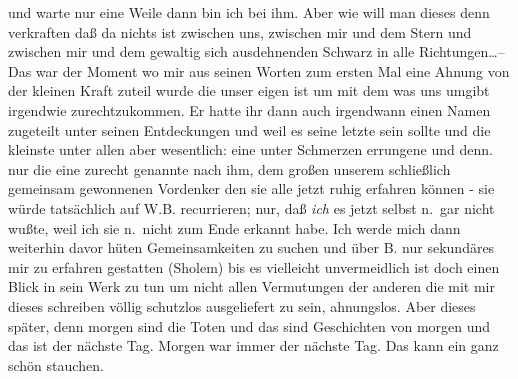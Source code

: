 \documentclass[
]{article}
\begin{document}
\begin{itemize}
  und warte nur eine Weile dann bin ich bei ihm. Aber wie will man
  dieses denn verkraften daß da nichts ist zwischen uns, zwischen mir
  und dem Stern und zwischen mir und dem gewaltig sich ausdehnenden
  Schwarz in alle Richtungen\ldots-- Das war der Moment wo mir aus
  seinen Worten zum ersten Mal eine Ahnung von der kleinen Kraft zuteil
  wurde die unser eigen ist um mit dem was uns umgibt irgendwie
  zurechtzukommen. Er hatte ihr dann auch irgendwann einen Namen
  zugeteilt unter seinen Entdeckungen und weil es seine letzte sein
  sollte und die kleinste unter allen aber wesentlich: eine unter
  Schmerzen errungene und denn. nur die eine zurecht genannte nach ihm,
  dem großen unserem schließlich gemeinsam gewonnenen Vordenker den sie
  alle jetzt ruhig erfahren können - sie würde tatsächlich auf W.B.
  recurrieren; nur, daß \emph{ich} es jetzt selbst n.~gar nicht wußte,
  weil ich sie n.~nicht zum Ende erkannt habe. Ich werde mich dann
  weiterhin davor hüten Gemeinsamkeiten zu suchen und über B. nur
  sekundäres mir zu erfahren gestatten (Sholem) bis es vielleicht
  unvermeidlich ist doch einen Blick in sein Werk zu tun um nicht allen
  Vermutungen der anderen die mit mir dieses schreiben völlig schutzlos
  ausgeliefert zu sein, ahnungslos. Aber dieses später, denn morgen sind
  die Toten und das sind Geschichten von morgen und das ist der nächste
  Tag. Morgen war immer der nächste Tag. Das kann ein ganz schön
  stauchen.
\end{itemize}
\end{document}
